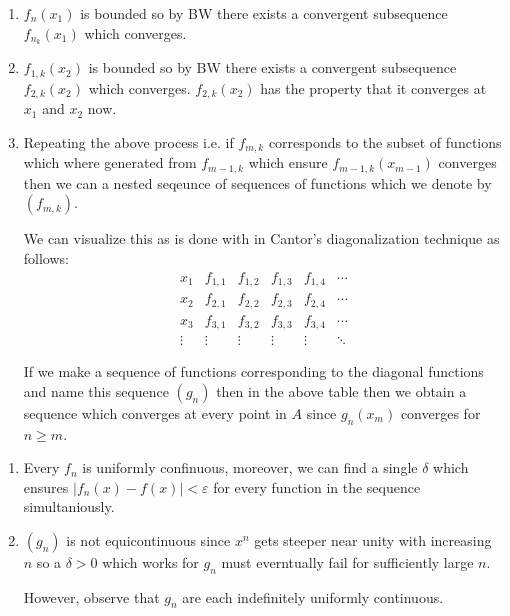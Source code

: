 
\begin{enumerate}[label=(\alph*)]
    \item 
    $f_n(x_1)$ is bounded so by BW there exists a convergent subsequence 
    $f_{n_k}(x_1)$ which converges. 

    \item
    $f_{1,k}(x_2)$ is bounded so by BW there exists a convergent subsequence 
    $f_{2,k}(x_2)$ which converges. $f_{2,k}(x_2)$ has the property that it converges 
    at $x_1$ and $x_2$ now.

    \item
    Repeating the above process i.e. if $f_{m,k}$ corresponds to the subset of functions 
    which where generated from $f_{m-1,k}$ which ensure $f_{m-1,k}(x_{m-1})$
    converges then we can a nested seqeunce of sequences of functions which we denote 
    by $(f_{m,k})$.

    We can visualize this as is done with in Cantor’s
    diagonalization technique as follows: 
    \[
        \begin{array}{c|ccccc}
            x_1 & f_{1,1} & f_{1,2} & f_{1,3} & f_{1,4} & \cdots \\
            x_2 & f_{2,1} & f_{2,2} & f_{2,3} & f_{2,4} & \cdots \\
            x_3 & f_{3,1} & f_{3,2} & f_{3,3} & f_{3,4} & \cdots \\
            \vdots & \vdots & \vdots & \vdots & \vdots & \ddots
         \end{array}
    \]

    If we make a sequence of functions corresponding to the diagonal functions 
    and name this sequence $(g_n)$ then 
    in the above table then we obtain a sequence which converges at every point in 
    $A$ since $g_n(x_m)$ converges for $n\geq m$.
\end{enumerate}

\begin{enumerate}[label=(\alph*)]
    \item 
    Every $f_n$ is uniformly confinuous, moreover, we can find a single $\delta$
    which ensures $|f_n(x)-f(x)|<\varepsilon$ for every function in the sequence
    simultaniously.

    \item
    $(g_n)$ is not equicontinuous since $x^n$ gets steeper near unity with increasing $n$
    so a $\delta>0$ which works for $g_n$ must everntually fail for sufficiently large $n$.

    However, observe that $g_n$ are each indefinitely uniformly continuous.
\end{enumerate}

